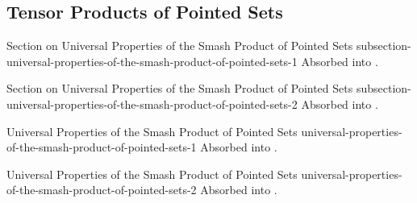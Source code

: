 \subsection{Tensor Products of Pointed Sets}\label{section-tensor-products-of-pointed-sets}
\begin{oldtag}{Section on Universal Properties of the Smash Product of Pointed Sets \rmI}{subsection-universal-properties-of-the-smash-product-of-pointed-sets-1}%
    Absorbed into .
\end{oldtag}
\begin{oldtag}{Section on Universal Properties of the Smash Product of Pointed Sets \rmII}{subsection-universal-properties-of-the-smash-product-of-pointed-sets-2}%
    Absorbed into .
\end{oldtag}
\begin{oldtag}{Universal Properties of the Smash Product of Pointed Sets \rmI}{universal-properties-of-the-smash-product-of-pointed-sets-1}%
    Absorbed into .
\end{oldtag}
\begin{oldtag}{Universal Properties of the Smash Product of Pointed Sets \rmII}{universal-properties-of-the-smash-product-of-pointed-sets-2}%
    Absorbed into .
\end{oldtag}
